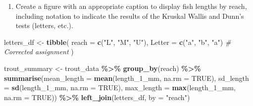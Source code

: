 \documentclass[
]{article}
\newenvironment{Shaded}{\begin{snugshade}}{\end{snugshade}}
\newcommand{\AttributeTok}[1]{\textcolor[rgb]{0.13,0.29,0.53}{#1}}
\newcommand{\CommentTok}[1]{\textcolor[rgb]{0.56,0.35,0.01}{\textit{#1}}}
\newcommand{\ConstantTok}[1]{\textcolor[rgb]{0.56,0.35,0.01}{#1}}
\newcommand{\FunctionTok}[1]{\textcolor[rgb]{0.13,0.29,0.53}{\textbf{#1}}}
\newcommand{\NormalTok}[1]{#1}
\newcommand{\OtherTok}[1]{\textcolor[rgb]{0.56,0.35,0.01}{#1}}
\newcommand{\SpecialCharTok}[1]{\textcolor[rgb]{0.81,0.36,0.00}{\textbf{#1}}}
\newcommand{\StringTok}[1]{\textcolor[rgb]{0.31,0.60,0.02}{#1}}
\providecommand{\tightlist}{%
  \setlength{\itemsep}{0pt}\setlength{\parskip}{0pt}}
\begin{document}
\begin{enumerate}
\def\labelenumi{\alph{enumi}.}
\setcounter{enumi}{1}
\tightlist
\item
  Create a figure with an appropriate caption to display fish lengths by
  reach, including notation to indicate the results of the Kruskal
  Wallis and Dunn's tests (letters, etc.).
\end{enumerate}

\begin{Shaded}
\begin{Highlighting}[]
\NormalTok{letters\_df }\OtherTok{\textless{}{-}} \FunctionTok{tibble}\NormalTok{(}
  \AttributeTok{reach =} \FunctionTok{c}\NormalTok{(}\StringTok{"L"}\NormalTok{, }\StringTok{"M"}\NormalTok{, }\StringTok{"U"}\NormalTok{),}
  \AttributeTok{Letter =} \FunctionTok{c}\NormalTok{(}\StringTok{"a"}\NormalTok{, }\StringTok{"b"}\NormalTok{, }\StringTok{"a"}\NormalTok{) }\CommentTok{\# Corrected assignment}
\NormalTok{)}

\NormalTok{trout\_summary }\OtherTok{\textless{}{-}}\NormalTok{ trout\_data }\SpecialCharTok{\%\textgreater{}\%}
  \FunctionTok{group\_by}\NormalTok{(reach) }\SpecialCharTok{\%\textgreater{}\%}
  \FunctionTok{summarise}\NormalTok{(}\AttributeTok{mean\_length =} \FunctionTok{mean}\NormalTok{(length\_1\_mm, }\AttributeTok{na.rm =} \ConstantTok{TRUE}\NormalTok{),}
            \AttributeTok{sd\_length =} \FunctionTok{sd}\NormalTok{(length\_1\_mm, }\AttributeTok{na.rm =} \ConstantTok{TRUE}\NormalTok{),}
            \AttributeTok{max\_length =} \FunctionTok{max}\NormalTok{(length\_1\_mm, }\AttributeTok{na.rm =} \ConstantTok{TRUE}\NormalTok{)) }\SpecialCharTok{\%\textgreater{}\%}
  \FunctionTok{left\_join}\NormalTok{(letters\_df, }\AttributeTok{by =} \StringTok{"reach"}\NormalTok{)}


\end{Highlighting}
\end{Shaded}
\end{document}
